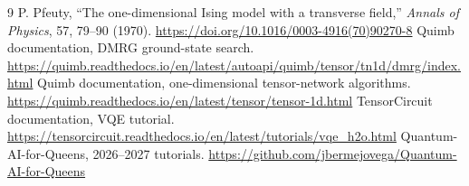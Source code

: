 \documentclass[11pt,a4paper]{article}
\begin{document}
\begin{thebibliography}{9}
 P. Pfeuty, ``The one-dimensional Ising model with a transverse field,'' \emph{Annals of Physics}, 57, 79--90 (1970). \url{https://doi.org/10.1016/0003-4916(70)90270-8}
 Quimb documentation, DMRG ground-state search. \url{https://quimb.readthedocs.io/en/latest/autoapi/quimb/tensor/tn1d/dmrg/index.html}
 Quimb documentation, one-dimensional tensor-network algorithms. \url{https://quimb.readthedocs.io/en/latest/tensor/tensor-1d.html}
 TensorCircuit documentation, VQE tutorial. \url{https://tensorcircuit.readthedocs.io/en/latest/tutorials/vqe_h2o.html}
 Quantum-AI-for-Queens, 2026--2027 tutorials. \url{https://github.com/jbermejovega/Quantum-AI-for-Queens}
\end{thebibliography}
\end{document}
